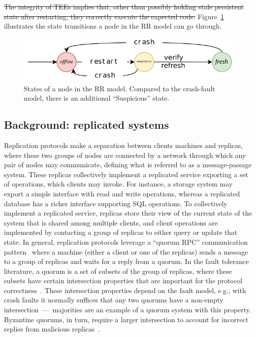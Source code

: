 \sout{The
integrity of \acp{TEE} implies that, other than possibly holding stale
persistent state after restarting, they correctly execute the
expected code.} Figure~\ref{fig:states} illustrates the state
transitions a node in the \ac{RR} model can go through.

\begin{figure}[t]
    \centering
    \includegraphics[width=\linewidth]{img/RR_states}
    \caption{States of a node in the \ac{RR} model. Compared
      to the crash-fault model, there is an additional ``Suspicious''
      state.}\label{fig:states}
\end{figure}

\subsection{Background: replicated systems}\label{ssec:sys_model}

Replication protocols make a separation between clients machines
and replicas, where these two groups of nodes are connected by a
network through which any pair of nodes may communicate, defining
what is referred to as a message-passage system. These replicas
collectively implement a replicated service exporting a set of
operations, which clients may invoke. For instance, a storage
system may export a simple interface with read and write
operations, whereas a replicated database has a richer interface
supporting SQL operations. To collectively implement a replicated
service, replicas store their view of the current state of the
system that is shared among multiple clients, and client
operations are implemented by contacting a group of replicas to
either query or update that state. In general, replication
protocols leverage a ``quorum RPC'' communication
pattern~\cite{Malkhi:Reiter:BQS:98,lorenzo:framework} where a
machine (either a client or one of the replicas) sends a message
to a group of replicas and waits for a reply from a quorum. In
the fault tolerance literature, a quorum is a set of subsets of
the group of replicas, where these subsets have certain
intersection properties that are important for the protocol
correctness~\cite{gifford:quorums}. These intersection properties
depend on the fault model, e.g., with crash faults it normally
suffices that any two quorums have a non-empty
intersection~---~majorities are an example of a quorum system
with this property. Byzantine quorums, in turn, require a larger
intersection to account for incorrect replies from malicious
replicas~\cite{Malkhi:Reiter:BQS:98}.

